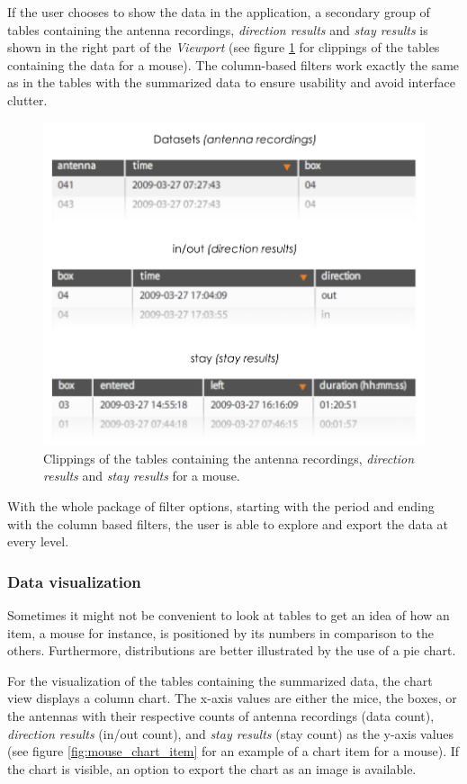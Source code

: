 If the user chooses to show the data in the application, a secondary group of tables containing the antenna recordings, \textit{direction results} and \textit{stay results} is shown in the right part of the \textit{Viewport} (see figure \ref{fig:overview_data} for clippings of the tables containing the data for a mouse). The column-based filters work exactly the same as in the tables with the summarized data to ensure usability and avoid interface clutter. 

\begin{figure}[htpb]
\begin{center}
  \includegraphics[width=.66\textwidth]{assets/pdf/overview_data.pdf}
  \caption[Clippings of the tables containing the results for a mouse]{Clippings of the tables containing the antenna recordings, \textit{direction results} and \textit{stay results} for a mouse.}
  \label{fig:overview_data}
\end{center}
\end{figure}  

With the whole package of filter options, starting with the period and ending with the column based filters, the user is able to explore and export the data at every level.       

\subsubsection{Data visualization}
\label{subsubsec:datavis}

Sometimes it might not be convenient to look at tables to get an idea of how an item, a mouse for instance, is positioned by its numbers in comparison to the others. Furthermore, distributions are better illustrated by the use of a pie chart. 

For the visualization of the tables containing the summarized data, the chart view displays a column chart. The x-axis values are either the mice, the boxes, or the antennas with their respective counts of antenna recordings (data count), \textit{direction results} (in/out count), and \textit{stay results} (stay count) as the y-axis values (see figure \ref{fig:mouse_chart_item} for an example of a chart item for a mouse). If the chart is visible, an option to export the chart as an image is available.

